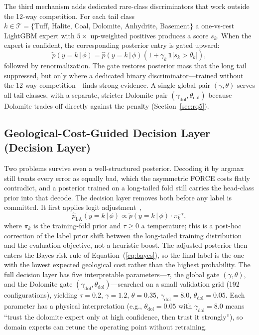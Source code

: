 \documentclass[bdcc,article,submit,pdftex,moreauthors]{Definitions/mdpi}
\begin{document}
The third mechanism adds dedicated rare-class discriminators that work outside the 12-way
competition. For each tail class $k\in\mathcal T=\{\text{Tuff, Halite,
Coal, Dolomite, Anhydrite, Basement}\}$ a one-vs-rest LightGBM expert with $5\times$
up-weighted positives produces a score $s_k$. When the expert is confident, the corresponding
posterior entry is gated upward:
\begin{equation}
\tilde p(y=k\,|\,\phi) = \hat p(y=k\,|\,\phi)\!\left(1+\gamma_k\,\mathbf 1\bigl[s_k>\theta_k\bigr]\right),
\label{eq:gate}
\end{equation}
followed by renormalization. The gate restores posterior mass that the long tail suppressed,
but only where a dedicated binary discriminator---trained without the 12-way
competition---finds strong evidence. A single global pair $(\gamma,\theta)$ serves all tail
classes, with a separate, stricter Dolomite pair $(\gamma_\text{dol},\theta_\text{dol})$
because Dolomite trades off directly against the penalty (Section~\ref{sec:rq5}).

\subsection{Geological-Cost-Guided Decision Layer (Decision Layer)}
\label{sec:decision}
Two problems survive even a well-structured posterior. Decoding it by argmax still treats
every error as equally bad, which the asymmetric FORCE costs flatly contradict, and a
posterior trained on a long-tailed fold still carries the head-class prior into that decode.
The decision layer removes both before any label is committed. It first applies logit
adjustment~\cite{menon2021logit},
\begin{equation}
\hat p_\text{LA}(y=k\,|\,\phi)\propto \tilde p(y=k\,|\,\phi)\cdot \pi_k^{-\tau},
\label{eq:logitadj}
\end{equation}
where $\pi_k$ is the training-fold prior and $\tau\geq 0$ a temperature; this is a post-hoc
correction of the label prior shift between the long-tailed training distribution and the
evaluation objective, not a heuristic boost. The adjusted posterior then enters the
Bayes-risk rule of Equation~(\ref{eq:bayes}), so the final label is the one with the lowest
expected geological cost rather than the highest probability. The full decision layer has
five interpretable parameters---$\tau$, the global gate $(\gamma,\theta)$, and the Dolomite gate
$(\gamma_\text{dol},\theta_\text{dol})$---searched on a small validation grid (192
configurations), yielding $\tau=0.2$, $\gamma=1.2$, $\theta=0.35$,
$\gamma_\text{dol}=8.0$, $\theta_\text{dol}=0.05$. Each parameter has a physical interpretation (e.g.,
$\theta_\text{dol}=0.05$ with $\gamma_\text{dol}=8.0$ means ``trust the dolomite expert only
at high confidence, then trust it strongly''), so domain experts can retune the operating
point without retraining.
\end{document}
